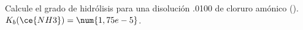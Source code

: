 Calcule el grado de hidrólisis para una disolución \SI{,0100}{\Molar} de cloruro amónico (). $K_b(\ce{NH3})=\num{1,75e-5}$.
